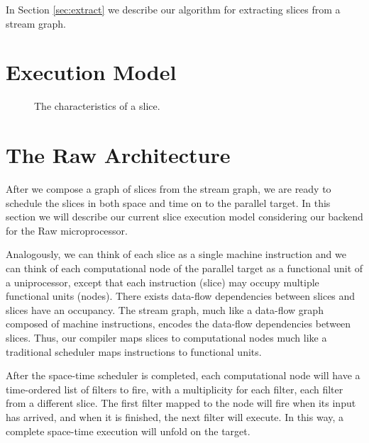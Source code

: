 In Section \ref{sec:extract} we describe our algorithm for extracting
slices from a stream graph.

\section{Execution Model}
\begin{figure}[t]
\centering
{}
\caption{The characteristics of a slice.
\protect\label{fig:slice}}
\end{figure}

\section{The Raw Architecture}
\label{sec:raw}
After we compose a graph of slices from the stream graph, we are ready
to schedule the slices in both space and time on to the parallel
target.  In this section we will describe our current slice execution
model considering our backend for the Raw microprocessor.

Analogously, we can think of each slice as a single machine
instruction and we can think of each computational node of the
parallel target as a functional unit of a uniprocessor, except that
each instruction (slice) may occupy multiple functional units
(nodes). There exists data-flow dependencies between slices and slices
have an occupancy.  The stream graph, much like a data-flow graph
composed of machine instructions, encodes the data-flow dependencies
between slices. Thus, our compiler maps slices to computational nodes
much like a traditional scheduler maps instructions to functional
units.

After the space-time scheduler is completed, each computational node
will have a time-ordered list of filters to fire, with a multiplicity
for each filter, each filter from a different slice.  The first
filter mapped to the node will fire when its input has arrived, and
when it is finished, the next filter will execute.  In this way, a
complete space-time execution will unfold on the target.

